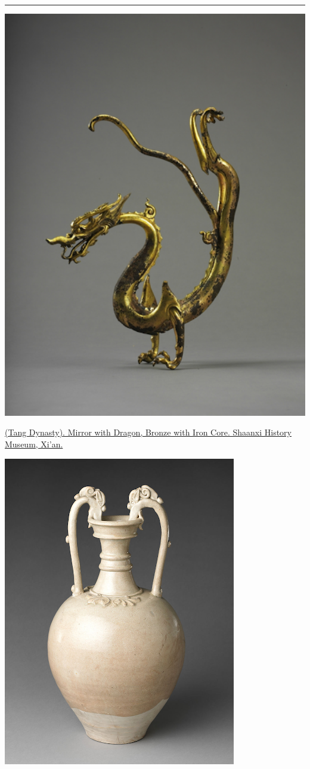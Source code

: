 \documentclass[
]{book}
\begin{document}
\begin{center}\rule{0.5\linewidth}{0.5pt}\end{center}

\includegraphics[width=1.2\textwidth,height=\textheight]{images/gilded_dragon.png}

\href{}{(Tang Dynasty). Mirror with Dragon, Bronze with Iron Core. Shaanxi History Museum, Xi'an.}

\includegraphics{images/jar.png}
\end{document}
